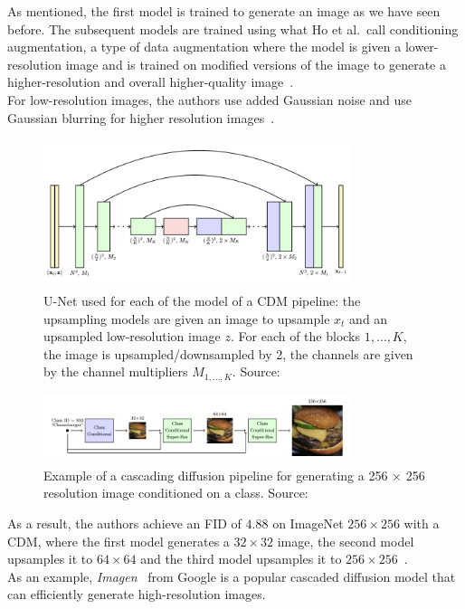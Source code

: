 \documentclass{article}
\numberwithin{equation}{section}
\numberwithin{figure}{section}
\begin{document}
As mentioned, the first model is trained to generate an image as we have seen before. The subsequent models are trained using what Ho et al.\ call conditioning augmentation, a type of data augmentation where the model is given a lower-resolution image and is trained on modified versions of the image to generate a higher-resolution and overall higher-quality image~\cite{ho2021cascaded}. \\
For low-resolution images, the authors use added Gaussian noise and use Gaussian blurring for higher resolution images~\cite{ho2021cascaded}.
\begin{figure}[h]
  \begin{center}
    \includegraphics[width=0.8\textwidth]{images/cascadedUnet.png}
    \caption{U-Net used for each of the model of a CDM pipeline: the upsampling models are given an image to upsample $x_t$ and an upsampled low-resolution image $z$. For each of the blocks $1, \dots, K$, the image is upsampled/downsampled by 2, the channels are given by the channel multipliers $M_{1, \dots, K}$. Source:~\cite{ho2021cascaded}}
  \end{center}
\end{figure}
\begin{figure}[h]
  \begin{center}
    \includegraphics[width=0.8\textwidth]{images/cascading.png}
    \caption{Example of a cascading diffusion pipeline for generating a 256 $\times$ 256 resolution image conditioned on a class. Source:~\cite{ho2021cascaded}}
  \end{center}
\end{figure}

As a result, the authors achieve an FID of $4.88$ on ImageNet $256 \times 256$ with a CDM, where the first model generates a $32 \times 32$ image, the second model upsamples it to $64 \times 64$ and the third model upsamples it to $256 \times 256$~\cite{ho2021cascaded}. \\
As an example, \textit{Imagen}~\cite{saharia2022photorealistic} from Google is a popular cascaded diffusion model that can efficiently generate high-resolution images.
\end{document}
